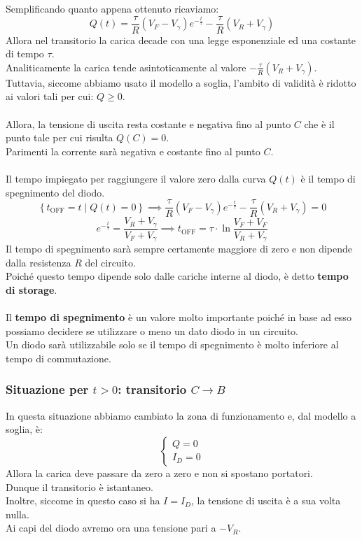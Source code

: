 \documentclass{article}
\numberwithin{equation}{subsection}
\begin{document}
	Semplificando quanto appena ottenuto ricaviamo:
	$$Q(t) = \frac{\tau}{R} (V_F - V_\gamma) e^{-\frac{t}{\tau}} - \frac{\tau}{R} (V_R + V_\gamma)$$
	Allora nel transitorio la carica decade con una legge esponenziale ed una costante di tempo $\tau$. \\
	Analiticamente la carica tende asintoticamente al valore $-\frac{\tau}{R} (V_R + V_\gamma)$. \\
	Tuttavia, siccome abbiamo usato il modello a soglia, l’ambito di validità è ridotto ai valori tali per cui: $Q \geq 0$.\\\\
	Allora, la tensione di uscita resta costante e negativa fino al punto $C$ che è il punto tale per cui risulta $Q(C) = 0$. \\
	Parimenti la corrente sarà negativa e costante fino al punto $C$.\\\\
	Il tempo impiegato per raggiungere il valore zero dalla curva $Q(t)$ è il tempo di spegnimento del diodo.
	$$\left\{t_{\text{OFF}} = t \mid Q(t) = 0\right\} \implies \frac{\tau}{R} (V_F - V_\gamma) e^{-\frac{t}{\tau}} - \frac{\tau}{R} (V_R + V_\gamma) = 0$$ $$e^{-\frac{t}{\tau}} = \frac{V_R + V_\gamma}{V_F + V_\gamma} \implies t_{\text{OFF}} = \tau \cdot \ln \frac{V_F + V_F}{V_R + V_\gamma}$$
	Il tempo di spegnimento sarà sempre certamente maggiore di zero e non dipende dalla resistenza $R$ del circuito. \\
	Poiché questo tempo dipende solo dalle cariche interne al diodo, è detto \textbf{tempo di storage}.\\\\
	Il \textbf{tempo di spegnimento} è un valore molto importante poiché in base ad esso possiamo decidere se utilizzare o meno un dato diodo in un circuito.\\
	Un diodo sarà utilizzabile solo se il tempo di spegnimento è molto inferiore al tempo di commutazione.
	\subsubsection{Situazione per $t > 0$: transitorio $C \rightarrow B$}
	In questa situazione abbiamo cambiato la zona di funzionamento e, dal modello a soglia, è:
	$$\begin{cases} Q = 0 \\ I_D = 0 \end{cases}$$
	Allora la carica deve passare da zero a zero e non si spostano portatori. \\
	Dunque il transitorio è istantaneo. \\
	Inoltre, siccome in questo caso si ha $I = I_D$, la tensione di uscita è a sua volta nulla. \\
	Ai capi del diodo avremo ora una tensione pari a $-V_R$.
\end{document}
